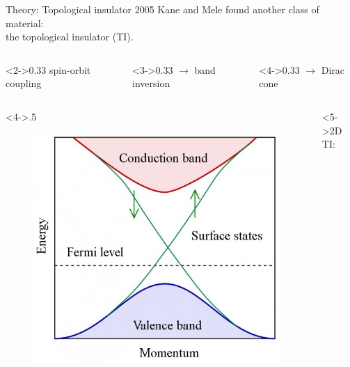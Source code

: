 \begin{frame}{Theory: Topological insulator}
	2005 Kane and Mele found another class of material: \\the topological insulator (TI).
	\\
	\begin{columns}
		\begin{column}<2->{0.33\linewidth}
			spin-orbit coupling
		\end{column}
		\hspace{-1cm}
		\begin{column}<3->{0.33\linewidth}
			$\rightarrow$ band inversion
		\end{column}
		\hspace{-1.2cm}
		\begin{column}<4->{0.33\linewidth}
			$\rightarrow$ Dirac cone
		\end{column}
	\end{columns}
	\begin{columns}
		\begin{column}<4->{.5\linewidth}
			\begin{figure}
				\includegraphics[width=\textwidth]{andere_bilder/band_structure_top_insulator}
			\end{figure}
		\end{column}
		\begin{column}{.5\linewidth}
			\begin{block}<5->{2D TI: }

\end{block}
\end{column}
\end{columns}
\end{frame}
